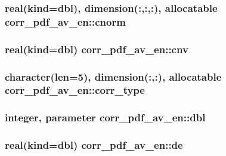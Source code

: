 \hypertarget{classcorr__pdf__av__en_a25097c83cec542769bb71b103aceb30c}{
\subsubsection[{cnorm}]{\setlength{\rightskip}{0pt plus 5cm}real(kind={\bf dbl}), dimension(\+:,\+:,\+:), allocatable corr\+\_\+pdf\+\_\+av\+\_\+en\+::cnorm}}\label{classcorr__pdf__av__en_a25097c83cec542769bb71b103aceb30c}
\hypertarget{classcorr__pdf__av__en_a26df89b0aa7d44e44aa8451d0343f6f9}{
\subsubsection[{cnv}]{\setlength{\rightskip}{0pt plus 5cm}real(kind={\bf dbl}) corr\+\_\+pdf\+\_\+av\+\_\+en\+::cnv}}\label{classcorr__pdf__av__en_a26df89b0aa7d44e44aa8451d0343f6f9}
\hypertarget{classcorr__pdf__av__en_acf8f009c3fe731aebe4c0adec4f26171}{
\subsubsection[{corr\+\_\+type}]{\setlength{\rightskip}{0pt plus 5cm}character(len=5), dimension(\+:,\+:), allocatable corr\+\_\+pdf\+\_\+av\+\_\+en\+::corr\+\_\+type}}\label{classcorr__pdf__av__en_acf8f009c3fe731aebe4c0adec4f26171}
\hypertarget{classcorr__pdf__av__en_a411e74f2fd514aedb12054b21e1d7c58}{
\subsubsection[{dbl}]{\setlength{\rightskip}{0pt plus 5cm}integer, parameter corr\+\_\+pdf\+\_\+av\+\_\+en\+::dbl}}\label{classcorr__pdf__av__en_a411e74f2fd514aedb12054b21e1d7c58}
\hypertarget{classcorr__pdf__av__en_a46b995ce85642726046e7d078c2d7d31}{
\subsubsection[{de}]{\setlength{\rightskip}{0pt plus 5cm}real(kind={\bf dbl}) corr\+\_\+pdf\+\_\+av\+\_\+en\+::de}}\label{classcorr__pdf__av__en_a46b995ce85642726046e7d078c2d7d31}
